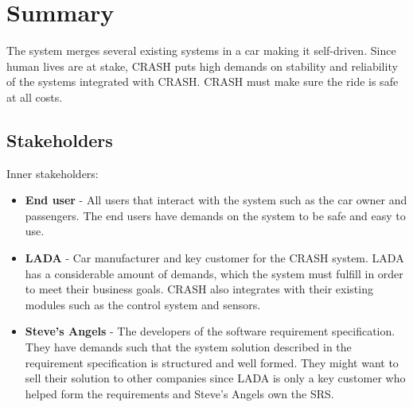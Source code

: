 \documentclass{article}
\begin{document}
\section{Summary}
\noindent The system merges several existing systems in a car making it self-driven. Since human lives are at stake, CRASH puts high demands on stability and reliability of the systems integrated with CRASH. CRASH must make sure the ride is safe at all costs.

\subsection{Stakeholders}
\noindent Inner stakeholders:
\begin{itemize}
\item \textbf{End user} - All users that interact with the system such as the car owner and passengers. The end users have demands on the system to be safe and easy to use.
\item \textbf{LADA} - Car manufacturer and key customer for the CRASH system. LADA has a considerable amount of demands, which the system must fulfill in order to meet their business goals. CRASH also integrates with their existing modules such as the control system and sensors.
\item \textbf{Steve's Angels} - The developers of the software requirement specification. They have demands such that the system solution described in the requirement specification is structured and well formed. They might want to sell their solution to other companies since LADA is only a key customer who helped form the requirements and Steve's Angels own the SRS.
\end{itemize}
\end{document}
